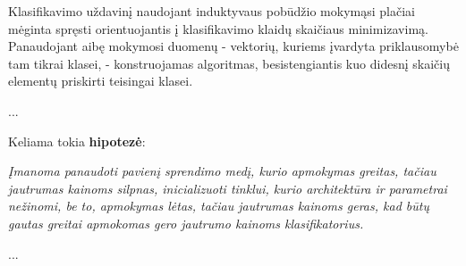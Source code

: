 Klasifikavimo uždavinį naudojant induktyvaus pobūdžio mokymąsi plačiai mėginta spręsti orientuojantis į klasifikavimo klaidų skaičiaus minimizavimą. Panaudojant aibę mokymosi duomenų - vektorių, kuriems įvardyta priklausomybė tam tikrai klasei, - konstruojamas algoritmas, besistengiantis kuo didesnį skaičių elementų priskirti teisingai klasei.

...

Keliama tokia \textbf{hipotezė}:

\emph{Įmanoma panaudoti pavienį sprendimo medį, kurio apmokymas greitas, tačiau jautrumas kainoms silpnas, inicializuoti tinklui, kurio architektūra ir parametrai nežinomi, be to, apmokymas lėtas, tačiau jautrumas kainoms geras, kad būtų gautas greitai apmokomas gero jautrumo kainoms klasifikatorius.} 

...

